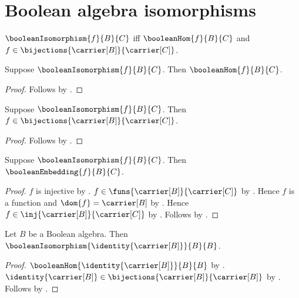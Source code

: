 \section{Boolean algebra isomorphisms}




\begin{definition}\label{boolean_isomorphism}
    $\booleanIsomorphism{f}{B}{C}$ iff
        $\booleanHom{f}{B}{C}$ and
        $f\in\bijections{\carrier[B]}{\carrier[C]}$.
\end{definition}

\begin{proposition}\label{boolean_isomorphism_is_hom}
    Suppose $\booleanIsomorphism{f}{B}{C}$.
    Then $\booleanHom{f}{B}{C}$.
\end{proposition}
\begin{proof}
    Follows by .
\end{proof}

\begin{proposition}\label{boolean_isomorphism_is_bijection}
    Suppose $\booleanIsomorphism{f}{B}{C}$.
    Then $f\in\bijections{\carrier[B]}{\carrier[C]}$.
\end{proposition}
\begin{proof}
    Follows by .
\end{proof}

\begin{corollary}\label{boolean_isomorphism_is_embedding}
    Suppose $\booleanIsomorphism{f}{B}{C}$.
    Then $\booleanEmbedding{f}{B}{C}$.
\end{corollary}
\begin{proof}
    $f$ is injective by
        .
    $f\in\funs{\carrier[B]}{\carrier[C]}$ by
        .
    Hence $f$ is a function and $\dom{f}=\carrier[B]$ by
        .
    Hence $f\in\inj{\carrier[B]}{\carrier[C]}$ by
        .
    Follows by
        .
\end{proof}

\begin{proposition}\label{identity_boolean_isomorphism}
    Let $B$ be a Boolean algebra.
    Then
        $\booleanIsomorphism{\identity{\carrier[B]}}{B}{B}$.
\end{proposition}
\begin{proof}
    $\booleanHom{\identity{\carrier[B]}}{B}{B}$ by
        .
    $\identity{\carrier[B]}\in
        \bijections{\carrier[B]}{\carrier[B]}$ by
        .
    Follows by .
\end{proof}

